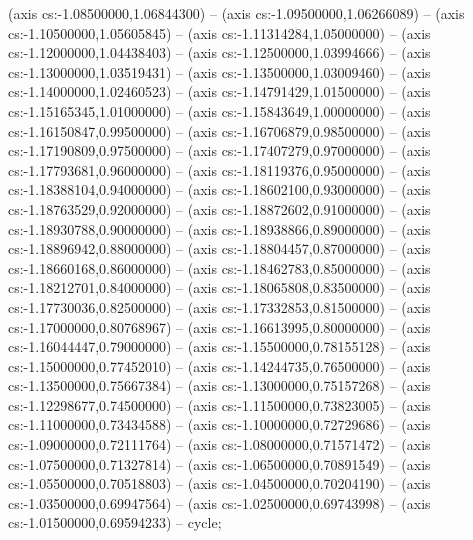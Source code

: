 (axis cs:-1.08500000,1.06844300) -- (axis cs:-1.09500000,1.06266089) -- (axis cs:-1.10500000,1.05605845) -- (axis cs:-1.11314284,1.05000000) -- (axis cs:-1.12000000,1.04438403) -- (axis cs:-1.12500000,1.03994666) -- (axis cs:-1.13000000,1.03519431) -- (axis cs:-1.13500000,1.03009460) -- (axis cs:-1.14000000,1.02460523) -- (axis cs:-1.14791429,1.01500000) -- (axis cs:-1.15165345,1.01000000) -- (axis cs:-1.15843649,1.00000000) -- (axis cs:-1.16150847,0.99500000) -- (axis cs:-1.16706879,0.98500000) -- (axis cs:-1.17190809,0.97500000) -- (axis cs:-1.17407279,0.97000000) -- (axis cs:-1.17793681,0.96000000) -- (axis cs:-1.18119376,0.95000000) -- (axis cs:-1.18388104,0.94000000) -- (axis cs:-1.18602100,0.93000000) -- (axis cs:-1.18763529,0.92000000) -- (axis cs:-1.18872602,0.91000000) -- (axis cs:-1.18930788,0.90000000) -- (axis cs:-1.18938866,0.89000000) -- (axis cs:-1.18896942,0.88000000) -- (axis cs:-1.18804457,0.87000000) -- (axis cs:-1.18660168,0.86000000) -- (axis cs:-1.18462783,0.85000000) -- (axis cs:-1.18212701,0.84000000) -- (axis cs:-1.18065808,0.83500000) -- (axis cs:-1.17730036,0.82500000) -- (axis cs:-1.17332853,0.81500000) -- (axis cs:-1.17000000,0.80768967) -- (axis cs:-1.16613995,0.80000000) -- (axis cs:-1.16044447,0.79000000) -- (axis cs:-1.15500000,0.78155128) -- (axis cs:-1.15000000,0.77452010) -- (axis cs:-1.14244735,0.76500000) -- (axis cs:-1.13500000,0.75667384) -- (axis cs:-1.13000000,0.75157268) -- (axis cs:-1.12298677,0.74500000) -- (axis cs:-1.11500000,0.73823005) -- (axis cs:-1.11000000,0.73434588) -- (axis cs:-1.10000000,0.72729686) -- (axis cs:-1.09000000,0.72111764) -- (axis cs:-1.08000000,0.71571472) -- (axis cs:-1.07500000,0.71327814) -- (axis cs:-1.06500000,0.70891549) -- (axis cs:-1.05500000,0.70518803) -- (axis cs:-1.04500000,0.70204190) -- (axis cs:-1.03500000,0.69947564) -- (axis cs:-1.02500000,0.69743998) -- (axis cs:-1.01500000,0.69594233) -- cycle;
